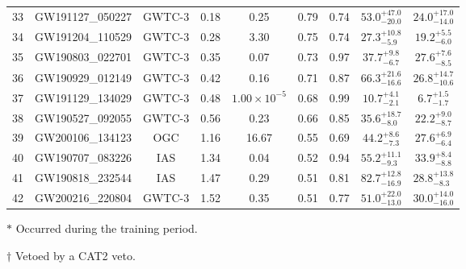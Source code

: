 \begin{table}[t]
\begin{threeparttable}
\begin{tabular}{!{\vrule width 1pt}lcccccccc!{\vrule width 1pt}}
33 & GW191127\_050227 & GWTC-3 & 0.18 & 0.25 & 0.79 & 0.74 & $53.0^{+47.0}_{-20.0}$ & $24.0^{+17.0}_{-14.0}$ \\
34 & GW191204\_110529 & GWTC-3 & 0.28 & 3.30 & 0.75 & 0.74 & $27.3^{+10.8}_{-5.9}$ & $19.2^{+5.5}_{-6.0}$ \\
35 & GW190803\_022701 & GWTC-3 & 0.35 & 0.07 & 0.73 & 0.97 & $37.7^{+9.8}_{-6.7}$ & $27.6^{+7.6}_{-8.5}$ \\
36 & GW190929\_012149 & GWTC-3 & 0.42 & 0.16 & 0.71 & 0.87 & $66.3^{+21.6}_{-16.6}$ & $26.8^{+14.7}_{-10.6}$ \\
37 & GW191129\_134029 & GWTC-3 & 0.48 & $1.00 \times 10^{-5}$ & 0.68 & 0.99 & $10.7^{+4.1}_{-2.1}$ & $6.7^{+1.5}_{-1.7}$ \\
38 & GW190527\_092055 & GWTC-3 & 0.56 & 0.23 & 0.66 & 0.85 & $35.6^{+18.7}_{-8.0}$ & $22.2^{+9.0}_{-8.7}$ \\
39 & GW200106\_134123 & OGC & 1.16 & 16.67 & 0.55 & 0.69 & ${44.2}_{-7.3}^{+8.6}$ & ${27.6}_{-6.4}^{+6.9}$ \\
40 & GW190707\_083226 & IAS & 1.34 & 0.04 & 0.52 & 0.94 & ${55.2}_{-9.3}^{+11.1}$ & ${33.9}_{-8.8}^{+8.4}$ \\
41 & GW190818\_232544 & IAS & 1.47 & 0.29 & 0.51 & 0.81 & ${82.7}_{-16.9}^{+12.8}$ & ${28.8}_{-8.3}^{+13.8}$ \\
42 & GW200216\_220804 & GWTC-3 & 1.52 & 0.35 & 0.51 & 0.77 & $51.0^{+22.0}_{-13.0}$ & $30.0^{+14.0}_{-16.0}$ \\
\bottomrule[1pt]
\end{tabular}
\begin{tablenotes}
\small
\item[$*$] Occurred during the training period.
\item[$\dagger$] Vetoed by a CAT2 veto.
\end{tablenotes}

\end{threeparttable}
\end{table}
